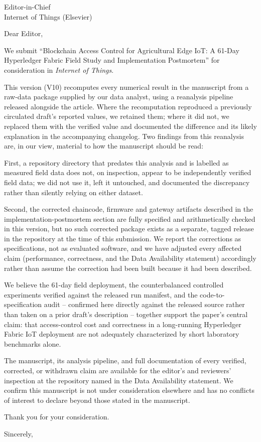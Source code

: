 \documentclass[11pt]{letter}
\begin{document}
\begin{letter}{Editor-in-Chief\\Internet of Things (Elsevier)}

\opening{Dear Editor,}

We submit ``Blockchain Access Control for Agricultural Edge IoT: A 61-Day Hyperledger Fabric Field Study and Implementation Postmortem'' for consideration in \emph{Internet of Things}.

This version (V10) recomputes every numerical result in the manuscript from a raw-data package supplied by our data analyst, using a reanalysis pipeline released alongside the article. Where the recomputation reproduced a previously circulated draft's reported values, we retained them; where it did not, we replaced them with the verified value and documented the difference and its likely explanation in the accompanying changelog. Two findings from this reanalysis are, in our view, material to how the manuscript should be read:

First, a repository directory that predates this analysis and is labelled as measured field data does not, on inspection, appear to be independently verified field data; we did not use it, left it untouched, and documented the discrepancy rather than silently relying on either dataset.

Second, the corrected chaincode, firmware and gateway artifacts described in the implementation-postmortem section are fully specified and arithmetically checked in this version, but no such corrected package exists as a separate, tagged release in the repository at the time of this submission. We report the corrections as specifications, not as evaluated software, and we have adjusted every affected claim (performance, correctness, and the Data Availability statement) accordingly rather than assume the correction had been built because it had been described.

We believe the 61-day field deployment, the counterbalanced controlled experiments verified against the released run manifest, and the code-to-specification audit -- confirmed here directly against the released source rather than taken on a prior draft's description -- together support the paper's central claim: that access-control cost and correctness in a long-running Hyperledger Fabric IoT deployment are not adequately characterized by short laboratory benchmarks alone.

The manuscript, its analysis pipeline, and full documentation of every verified, corrected, or withdrawn claim are available for the editor's and reviewers' inspection at the repository named in the Data Availability statement. We confirm this manuscript is not under consideration elsewhere and has no conflicts of interest to declare beyond those stated in the manuscript.

Thank you for your consideration.

\closing{Sincerely,}

\end{letter}
\end{document}
